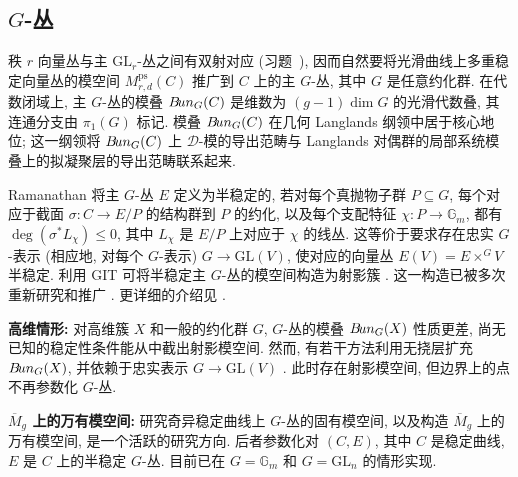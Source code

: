 \subsection{\texorpdfstring{$G$-丛}{G-丛}}\label{src:10.2.3-subsection}
秩 $r$ 向量丛与主 $\mathrm{GL}_r$-丛之间有双射对应 (习题~), 因而自然要将光滑曲线上多重稳定向量丛的模空间 $M_{r,d}^{\mathrm{ps}}(C)$ 推广到 $C$ 上的主 $G$-丛, 其中 $G$ 是任意约化群. 在代数闭域上, 主 $G$-丛的模叠 $B\!un_G(C)$ 是维数为 $(g-1)\dim G$ 的光滑代数叠, 其连通分支由 $\pi_1(G)$ 标记. 模叠 $B\!un_G(C)$ 在几何 Langlands 纲领中居于核心地位; 这一纲领将 $B\!un_G(C)$ 上 $\mathcal D$-模的导出范畴与 Langlands 对偶群的局部系统模叠上的拟凝聚层的导出范畴联系起来.

Ramanathan 将主 $G$-丛 $E$ 定义为半稳定的, 若对每个真抛物子群 $P\subseteq G$, 每个对应于截面 $\sigma:C\to E/P$ 的结构群到 $P$ 的约化, 以及每个支配特征 $\chi:P\to\mathbb G_m$, 都有 $\deg(\sigma^*L_\chi)\leq0$, 其中 $L_\chi$ 是 $E/P$ 上对应于 $\chi$ 的线丛. 这等价于要求存在忠实 $G$-表示 (相应地, 对每个 $G$-表示) $G\to\mathrm{GL}(V)$, 使对应的向量丛 $E(V)=E\times^G V$ 半稳定. 利用 GIT 可将半稳定主 $G$-丛的模空间构造为射影簇 \cite{Ram96}. 这一构造已被多次重新研究和推广 \cite{BS02,Sim94b,HS10}. 更详细的介绍见 \cite{Bal09,Sor99}.

\textbf{高维情形:} 对高维簇 $X$ 和一般的约化群 $G$, $G$-丛的模叠 $B\!un_G(X)$ 性质更差, 尚无已知的稳定性条件能从中截出射影模空间. 然而, 有若干方法利用无挠层扩充 $B\!un_G(X)$, 并依赖于忠实表示 $G\to\mathrm{GL}(V)$ \cite{Sch04,GS05,GLSS08}. 此时存在射影模空间, 但边界上的点不再参数化 $G$-丛.

\textbf{\texorpdfstring{$\overline M_g$}{Mgbar} 上的万有模空间:} 研究奇异稳定曲线上 $G$-丛的固有模空间, 以及构造 $\overline M_g$ 上的万有模空间, 是一个活跃的研究方向. 后者参数化对 $(C,E)$, 其中 $C$ 是稳定曲线, $E$ 是 $C$ 上的半稳定 $G$-丛. 目前已在 $G=\mathbb G_m$ \cite{Cap94} 和 $G=\mathrm{GL}_n$ \cite{Gie84,Pan96,NS99} 的情形实现.

